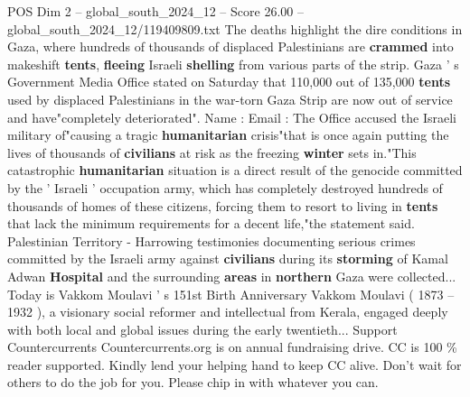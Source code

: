 \begin{textsample}{POS Dim 2 – global\_south\_2024\_12 – Score 26.00 – global\_south\_2024\_12/119409809.txt}
The deaths highlight the dire conditions in Gaza, where hundreds of thousands of displaced Palestinians are \textbf{crammed} into makeshift \textbf{tents}, \textbf{fleeing} Israeli \textbf{shelling} from various parts of the strip.
Gaza ' s Government Media Office stated on Saturday that 110,000 out of 135,000 \textbf{tents} used by displaced Palestinians in the war-torn Gaza Strip are now out of service and have"completely deteriorated".
Name : Email : The Office accused the Israeli military of"causing a tragic \textbf{humanitarian} crisis"that is once again putting the lives of thousands of \textbf{civilians} at risk as the freezing \textbf{winter} sets in."This catastrophic \textbf{humanitarian} situation is a direct result of the genocide committed by the ' Israeli ' occupation army, which has completely destroyed hundreds of thousands of homes of these citizens, forcing them to resort to living in \textbf{tents} that lack the minimum requirements for a decent life,"the statement said.
Palestinian Territory - Harrowing testimonies documenting serious crimes committed by the Israeli army against \textbf{civilians} during its \textbf{storming} of Kamal Adwan \textbf{Hospital} and the surrounding \textbf{areas} in \textbf{northern} Gaza were collected...
Today is Vakkom Moulavi ' s 151st Birth Anniversary Vakkom Moulavi ( 1873 -- 1932 ), a visionary social reformer and intellectual from Kerala, engaged deeply with both local and global issues during the early twentieth...
Support Countercurrents Countercurrents.org is on annual fundraising drive.
CC is 100 \% reader supported.
Kindly lend your helping hand to keep CC alive.
Don't wait for others to do the job for you.
Please chip in with whatever you can.

\end{textsample}
